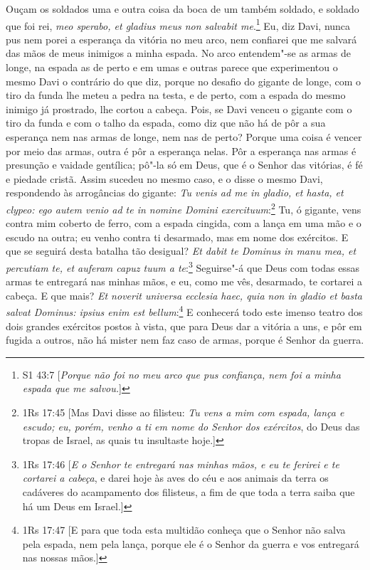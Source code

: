 Ouçam os soldados uma e outra coisa da boca de um também soldado, e
soldado que foi rei, \emph{meo sperabo, et gladius meus non salvabit me}.\footnote{S1 43:7 [\textit{Porque não foi no meu arco que pus confiança, nem foi a minha espada que me salvou.}]}
Eu, diz Davi, nunca pus nem porei a esperança da vitória no
meu arco, nem confiarei que me salvará das mãos de meus inimigos a minha
espada. No arco entendem"-se as armas de longe, na espada as de perto e
em umas e outras parece que experimentou o mesmo Davi o contrário do que
diz, porque no desafio do gigante de longe, com o tiro da funda lhe
meteu a pedra na testa, e de perto, com a espada do mesmo inimigo já
prostrado, lhe cortou a cabeça. Pois, se Davi venceu o gigante com o
tiro da funda e com o talho da espada, como diz que não há de pôr a sua
esperança nem nas armas de longe, nem nas de perto? Porque uma coisa é
vencer por meio das armas, outra é pôr a esperança nelas. Pôr a
esperança nas armas é presunção e vaidade gentílica; pô"-la só em Deus,
que é o Senhor das vitórias, é fé e piedade cristã.
Assim sucedeu no mesmo caso, e o disse o mesmo Davi, respondendo às
arrogâncias do gigante: \emph{Tu venis ad me in gladio, et hasta, et
clypeo: ego autem venio ad te in nomine Domini exercituum}:\footnote{1Rs 17:45 [Mas Davi disse ao filisteu: \textit{Tu vens a mim com espada, lança e escudo; eu,
porém, venho a ti em nome do Senhor dos exércitos}, do Deus das tropas de Israel, as quais tu insultaste hoje.]}
Tu, ó gigante, vens contra mim coberto de ferro, com a espada
cingida, com a lança em uma mão e o escudo na outra; eu venho contra ti
desarmado, mas em nome dos exércitos. E que se seguirá desta batalha tão
desigual? \emph{Et dabit te Dominus in manu mea, et percutiam te, et
auferam capuz tuum a te}:\footnote{1Rs 17:46 [\textit{E o Senhor te entregará nas minhas mãos, e eu te ferirei e te cortarei a cabeça}, e darei hoje às aves do céu e aos animais da terra os cadáveres do acampamento dos filisteus, a fim de que toda a terra saiba que há um Deus em Israel.]} Seguirse"-á que Deus com todas
essas armas te entregará nas minhas mãos, e eu, como me vês, desarmado,
te cortarei a cabeça. E que mais? \emph{Et noverit universa ecclesia
haec, quia non in gladio et basta salvat Dominus: ipsius enim est bellum}:\footnote{1Rs 17:47 [{E para que toda esta multidão conheça que o Senhor não salva pela espada, nem pela lança, porque ele é o Senhor da guerra} e vos entregará nas nossas mãos.]}
E conhecerá todo este imenso teatro dos dois grandes
exércitos postos à vista, que para Deus dar a vitória a uns, e pôr em
fugida a outros, não há mister nem faz caso de armas, porque é Senhor da
guerra.

